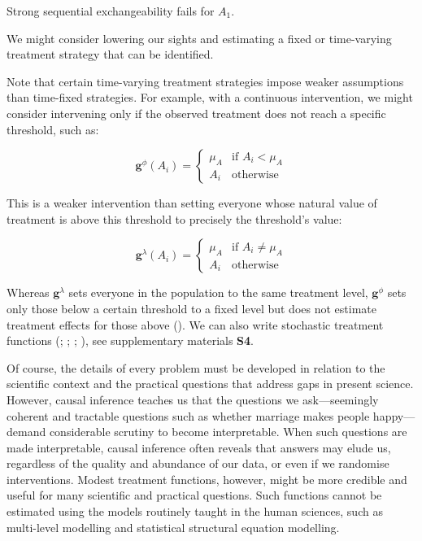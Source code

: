 \documentclass[
  single column]{article}
\begin{document}
Strong sequential exchangeability fails for \(A_1\).

We might consider lowering our sights and estimating a fixed or
time-varying treatment strategy that can be identified.

Note that certain time-varying treatment strategies impose weaker
assumptions than time-fixed strategies. For example, with a continuous
intervention, we might consider intervening only if the observed
treatment does not reach a specific threshold, such as:

\[
\mathbf{g}^{\phi} (A_i) = \begin{cases}  
\mu_A & \text{if } A_i < \mu_A \\ 
A_i & \text{otherwise} 
\end{cases}
\]

This is a weaker intervention than setting everyone whose natural value
of treatment is above this threshold to precisely the threshold's value:

\[
\mathbf{g}^{\lambda} (A_i) = \begin{cases}   
\mu_A & \text{if } A_i \neq \mu_A \\ 
A_i & \text{otherwise} 
\end{cases}
\]

Whereas \(\mathbf{g}^{\lambda}\) sets everyone in the population to the
same treatment level, \(\mathbf{g}^{\phi}\) sets only those below a
certain threshold to a fixed level but does not estimate treatment
effects for those above (). We can also write stochastic treatment functions
(;
;
;
), see
supplementary materials \textbf{S4}.

Of course, the details of every problem must be developed in relation to
the scientific context and the practical questions that address gaps in
present science. However, causal inference teaches us that the questions
we ask---seemingly coherent and tractable questions such as whether
marriage makes people happy---demand considerable scrutiny to become
interpretable. When such questions are made interpretable, causal
inference often reveals that answers may elude us, regardless of the
quality and abundance of our data, or even if we randomise
interventions. Modest treatment functions, however, might be more
credible and useful for many scientific and practical questions. Such
functions cannot be estimated using the models routinely taught in the
human sciences, such as multi-level modelling and statistical structural
equation modelling.
\end{document}

